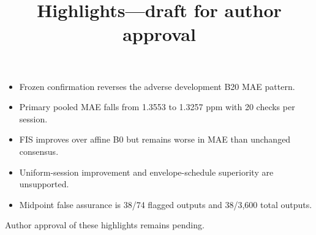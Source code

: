 \documentclass[11pt,a4paper]{article}
\title{Highlights---draft for author approval}
\date{}
\begin{document}
\maketitle
\begin{itemize}
\item Frozen confirmation reverses the adverse development B20 MAE pattern.
\item Primary pooled MAE falls from 1.3553 to 1.3257 ppm with 20 checks per session.
\item FIS improves over affine B0 but remains worse in MAE than unchanged consensus.
\item Uniform-session improvement and envelope-schedule superiority are unsupported.
\item Midpoint false assurance is 38/74 flagged outputs and 38/3,600 total outputs.
\end{itemize}
\noindent Author approval of these highlights remains pending.
\end{document}
